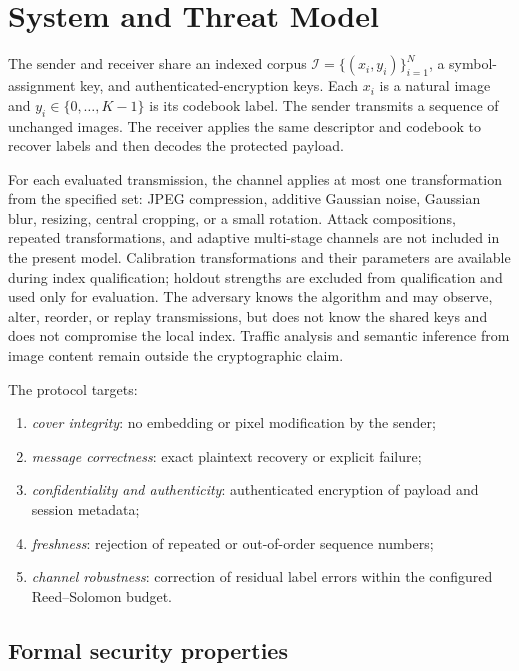 ﻿\documentclass[a4paper,fleqn]{cas-dc}
\begin{document}
\section{System and Threat Model}
\label{sec:model}

The sender and receiver share an indexed corpus
$\mathcal{I}=\{(x_i,y_i)\}_{i=1}^{N}$, a symbol-assignment key, and
authenticated-encryption keys. Each $x_i$ is a natural image and
$y_i\in\{0,\ldots,K-1\}$ is its codebook label. The sender transmits a
sequence of unchanged images. The receiver applies the same descriptor and
codebook to recover labels and then decodes the protected payload.

For each evaluated transmission, the channel applies at most one
transformation from the specified set: JPEG compression, additive Gaussian
noise, Gaussian blur, resizing, central cropping, or a small rotation. Attack
compositions, repeated transformations, and adaptive multi-stage channels are
not included in the present model. Calibration transformations and their
parameters are available during index qualification; holdout strengths are
excluded from qualification and used only for evaluation. The adversary knows
the algorithm and may observe, alter, reorder, or replay transmissions, but
does not know the shared keys and does not compromise the local index.
Traffic analysis and semantic inference from image content remain outside the
cryptographic claim.

The protocol targets:

\begin{enumerate}
\item \emph{cover integrity}: no embedding or pixel modification by the sender;
\item \emph{message correctness}: exact plaintext recovery or explicit failure;
\item \emph{confidentiality and authenticity}: authenticated encryption of
payload and session metadata;
\item \emph{freshness}: rejection of repeated or out-of-order sequence numbers;
\item \emph{channel robustness}: correction of residual label errors within
the configured Reed--Solomon budget.
\end{enumerate}

\subsection{Formal security properties}
\end{document}
